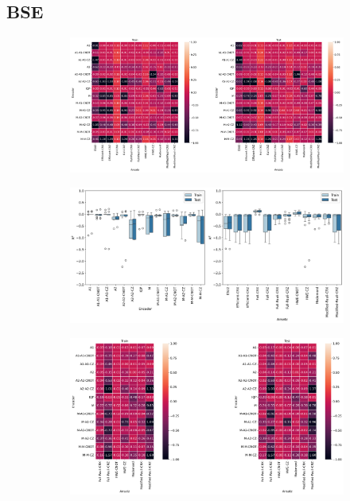 \documentclass[journal=jacsat,manuscript=article]{achemso}
\begin{document}
\subsection{BSE}
\begin{figure}[H]
	\centering	
	\begin{subfigure}[b]{0.49\textwidth}
		\centering
		\includegraphics[width=\linewidth]{../images/BSE/fivequbit/BSE_heatplots}
		\caption{}
		\label{fig:5BSE_heatplots}
	\end{subfigure}
	\hfill
	\begin{subfigure}[b]{0.49\textwidth}
		\centering
		\includegraphics[width=\linewidth]{../images/BSE/fivequbit/BSE_boxplots}
		\caption{}
		\label{fig:5BSE_boxplots}
	\end{subfigure}
	\hfill
	\begin{subfigure}[b]{0.49\textwidth}
		\centering
		\includegraphics[width=\linewidth]{../images/BSE/sixteenqubit/BSE_heatplots}

\end{subfigure}
\end{figure}
\end{document}
